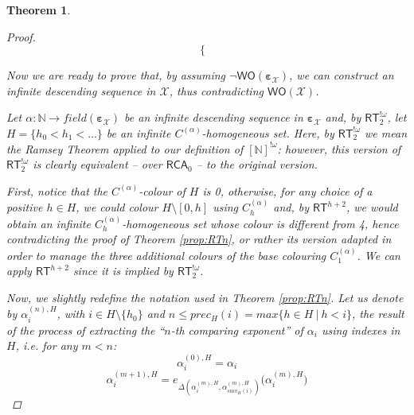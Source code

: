 \documentclass{amsart}
\newcommand\Nat{\mathbb{N}}
\newcommand\RCA{\mathsf{RCA}}
\newcommand\RT{\mathsf{RT}}
\newcommand\WO{\mathsf{WO}}
\newcommand{\LoX}{\mathcal{X}}
\newcommand\boldepsilon{\pmb{\varepsilon}}
\newtheorem{theorem}{Theorem}
\begin{document}
\begin{theorem}
\begin{proof}
\begin{equation*}
\begin{cases}
\end{cases}    
\end{equation*}

\smallskip
Now we are ready to prove that, by assuming $\neg\WO(\boldepsilon_\LoX)$, we can construct an infinite descending sequence in $\LoX$, thus contradicting $\WO(\LoX)$.

Let $\alpha : \Nat \rightarrow field(\boldepsilon_\LoX)$ be an infinite descending sequence in $\boldepsilon_\LoX$ and, by $\RT^{!\omega}_2$, let $H = \{h_0 < h_1 < \ldots\}$ be an infinite $C^{(\alpha)}$-homogeneous set. Here, by $\RT^{!\omega}_2$ we mean the Ramsey Theorem applied to our definition of $[\Nat]^{!\omega}$: however, this version of $\RT^{!\omega}_2$ is clearly equivalent -- over $\RCA_0$ -- to the original version.



First, notice that the $C^{(\alpha)}$-colour of $H$ is 0, otherwise, for any choice of a positive $h \in H$, we could colour $H \setminus [0, h]$ using $C_h^{(\alpha)}$ and, by $\RT^{h+2}$, we would obtain an infinite $C_h^{(\alpha)}$-homogeneous set whose colour is different from 4, hence contradicting the proof of Theorem \ref{prop:RTn}, or rather its version adapted in order to manage the three additional colours of the base colouring $C_1^{(\alpha)}$. We can apply $\RT^{h+2}$ since it is implied by $\RT^{!\omega}_2$.

Now, we slightly redefine the notation used in Theorem \ref{prop:RTn}. Let us denote by $\alpha_i^{(n),H}$, with $i \in H \setminus \{h_0\}$ and $n \leq prec_H(i) = max\{h \in H\ |\ h < i\}$, the result of the process of extracting the ``$n$-th comparing exponent'' of $\alpha_i$ using indexes in $H$, i.e. for any $m<n$:
\begin{equation*}
    \alpha_i^{(0),H} = \alpha_i
\end{equation*}
\begin{equation*}
    \alpha_i^{(m+1),H} = e_{\Delta(\alpha_i^{(m),H},\alpha_{succ_H(i)}^{(m),H})}\big(\alpha_i^{(m),H}\big)
\end{equation*}


\end{proof}
\end{theorem}
\end{document}
